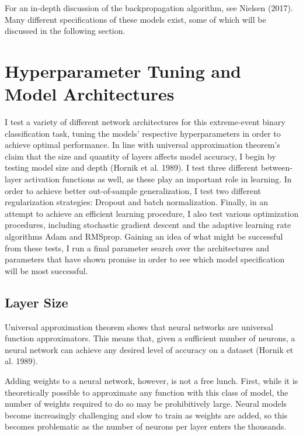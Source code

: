\documentclass[12pt]{article}  %
\theoremstyle{definition}
\theoremstyle{remark}
\begin{document}
\par For an in-depth discussion of the backpropagation algorithm, see Nielsen (2017). Many different specifications of these models exist, some of which will be discussed in the following section. 

\section{Hyperparameter Tuning and Model Architectures}
\par I test a variety of different network architectures for this extreme-event binary classification task, tuning the models' respective hyperparameters in order to achieve optimal performance. In line with universal approximation theorem's claim that the size and quantity of layers affects model accuracy, I begin by testing model size and depth (Hornik et al. 1989). I test three different between-layer activation functions as well, as these play an important role in learning. In order to achieve better out-of-sample generalization, I test two different regularization strategies: Dropout and batch normalization. Finally, in an attempt to achieve an efficient learning procedure, I also test various optimization procedures, including stochastic gradient descent and the adaptive learning rate algorithms Adam and RMSprop. Gaining an idea of what might be successful from these tests, I run a final parameter search over the architectures and parameters that have shown promise in order to see which model specification will be most successful.

\subsection{Layer Size}
\par Universal approximation theorem shows that neural networks are universal function approximators. This means that, given a sufficient number of neurons, a neural network can achieve any desired level of accuracy on a dataset (Hornik et al. 1989). 

\par Adding weights to a neural network, however, is not a free lunch. First, while it is theoretically possible to approximate any function with this class of model, the number of weights required to do so may be prohibitively large. Neural models become increasingly challenging and slow to train as weights are added, so this becomes problematic as the number of neurons per layer enters the thousands. 
\end{document}
